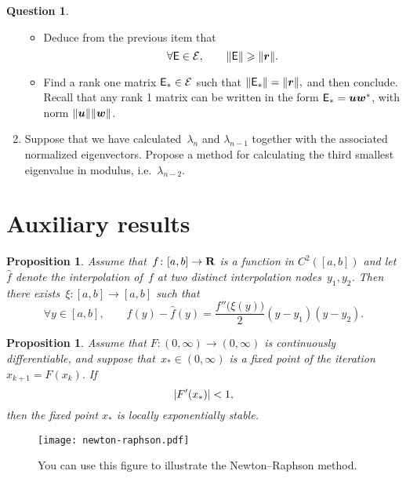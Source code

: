 \documentclass[11pt]{article}
\theoremstyle{definition}
\newtheorem{question}{Question}
\theoremstyle{remark}
\theoremstyle{plain}%
\newtheorem{proposition}[theorem]{Proposition}
\begin{document}
\begin{question}
\begin{enumerate}
\begin{itemize}
                \item
                    Deduce from the previous item that
                    \[
                        \forall \mathsf E \in \mathcal E, \qquad
                        \lVert\mathsf E\rVert \geqslant \lVert\mathbf{\boldsymbol{r}}\rVert.
                    \]

                \item
                    Find a rank one matrix $\mathsf E_* \in \mathcal E$ such that
                    \(
                    \lVert\mathsf E_*\rVert = \lVert\mathbf{\boldsymbol{r}}\rVert,
                    \)
                    and then conclude.
                    Recall that any rank 1 matrix can be written in the form $\mathsf E_* = \mathbf{\boldsymbol{u}} \mathbf{\boldsymbol{w}}^*$,
                    with norm $\lVert\mathbf{\boldsymbol{u}}\rVert \lVert\mathbf{\boldsymbol{w}}\rVert$.
            \end{itemize}

        \item
            Suppose that we have calculated~$\lambda_n$ and $\lambda_{n-1}$ together with the associated normalized eigenvectors.
            Propose a method for calculating the third smallest eigenvalue in modulus, i.e.\ $\lambda_{n-2}$.
    \end{enumerate}
\end{question}



\newpage

\section*{Auxiliary results}
\begin{proposition}
    \label{proposition:interpolation_error}
    Assume that~$f\colon [a, b] \to \mathbf R$ is a function in $C^{2}([a, b])$ and let $\widehat f$ denote
    the interpolation of~$f$ at two distinct interpolation nodes~$y_1, y_2$.
    Then there exists~$\xi\colon [a, b] \to [a, b]$ such that
    \[
        \forall y \in [a, b], \qquad
        f(y) - \widehat f(y) = \frac{f''\bigl(\xi(y)\bigr)}{2} (y-y_1) (y - y_2).
    \]
\end{proposition}

\begin{proposition}
    \label{proposition:local_convergence}
    Assume that $F\colon (0, \infty) \to (0, \infty)$ is continuously differentiable,
    and suppose that~$x_* \in (0, \infty)$ is a fixed point of the iteration
    \(
        x_{k+1} = F(x_k).
    \)
    If
    \[
        \lvert F'(x_*)\rvert < 1,
    \]
    then the fixed point $x_*$ is locally exponentially stable.
\end{proposition}

\begin{figure}[ht]
    \centering
    \texttt{[image: newton-raphson.pdf]}
    \caption{You can use this figure to illustrate the Newton--Raphson method.}%
    \label{fig:nr}
\end{figure}
\end{document}
